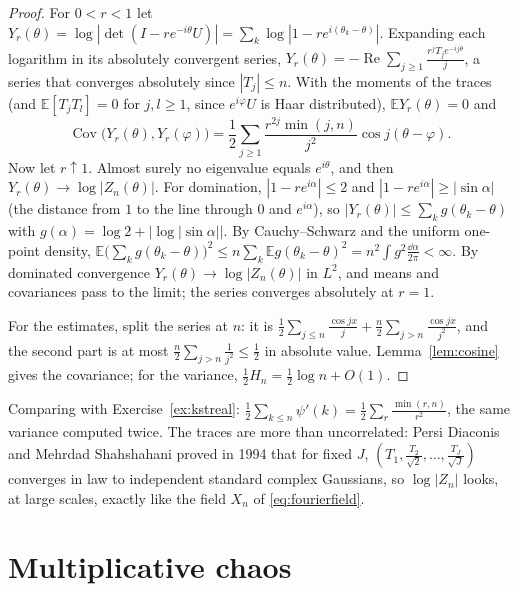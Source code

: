 \begin{proof}
For $0<r<1$ let $Y_r(\theta)=\log|\det(I-re^{-i\theta}U)|=\sum_k\log|1-re^{i(\theta_k-\theta)}|$. Expanding each logarithm in its absolutely convergent series, $Y_r(\theta)=-\operatorname{Re}\sum_{j\ge1}\frac{r^jT_je^{-ij\theta}}j$, a series that converges
absolutely since $|T_j|\le n$. With the moments of the traces (and $\mathbb E[T_jT_l]=0$ for $j,l\ge1$, since $e^{i\varphi}U$ is Haar distributed), $\mathbb EY_r(\theta)=0$ and
\[
\operatorname{Cov}\bigl(Y_r(\theta),Y_r(\varphi)\bigr)=\frac12\sum_{j\ge1}\frac{r^{2j}\min(j,n)}{j^2}\cos j(\theta-\varphi).
\]
Now let $r\uparrow1$. Almost surely no eigenvalue equals $e^{i\theta}$, and then $Y_r(\theta)\to\log|Z_n(\theta)|$. For domination, $|1-re^{i\alpha}|\le2$ and $|1-re^{i\alpha}|\ge|\sin\alpha|$ (the distance from $1$ to the line through $0$ and $e^{i\alpha}$), so
$|Y_r(\theta)|\le\sum_kg(\theta_k-\theta)$ with $g(\alpha)=\log2+|\log|\sin\alpha||$. By Cauchy--Schwarz and the uniform one-point density, $\mathbb E\bigl(\sum_kg(\theta_k-\theta)\bigr)^2\le n\sum_k\mathbb Eg(\theta_k-\theta)^2=n^2\int g^2\frac{\dd\alpha}{2\pi}<\infty$.
By dominated convergence $Y_r(\theta)\to\log|Z_n(\theta)|$ in $L^2$, and means and covariances pass to the limit; the series converges absolutely at $r=1$.

For the estimates, split the series at $n$: it is $\frac12\sum_{j\le n}\frac{\cos jx}j+\frac n2\sum_{j>n}\frac{\cos jx}{j^2}$, and the second part is at most $\frac n2\sum_{j>n}\frac1{j^2}\le\frac12$ in absolute value. Lemma~\ref{lem:cosine} gives the
covariance; for the variance, $\frac12H_n=\frac12\log n+O(1)$.
\end{proof}

Comparing with Exercise~\ref{ex:kstreal}: $\frac12\sum_{k\le n}\psi'(k)=\frac12\sum_{r}\frac{\min(r,n)}{r^2}$, the same variance computed twice. The traces are more than uncorrelated: Persi Diaconis and Mehrdad Shahshahani proved in 1994 that for
fixed $J$, $(T_1,\frac{T_2}{\sqrt2},\dots,\frac{T_J}{\sqrt J})$ converges in law to independent standard complex Gaussians, so $\log|Z_n|$ looks, at large scales, exactly like the field $X_n$ of \eqref{eq:fourierfield}.

\section{Multiplicative chaos}

